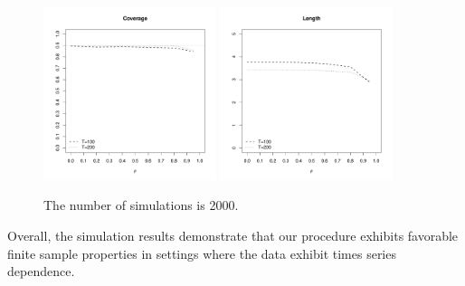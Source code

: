 \documentclass[final,12pt]{colt2018} %
\begin{document}
\begin{figure}[h]
\begin{center}
\includegraphics[width=0.45\textwidth]{coverage_007}
\includegraphics[width=0.45\textwidth]{length_007}
\end{center}
\caption{The number of simulations is 2000.}
\label{fig:coverage}
\end{figure}

Overall, the simulation results demonstrate that our procedure exhibits favorable finite sample properties in settings where the data exhibit times series dependence.
\end{document}
